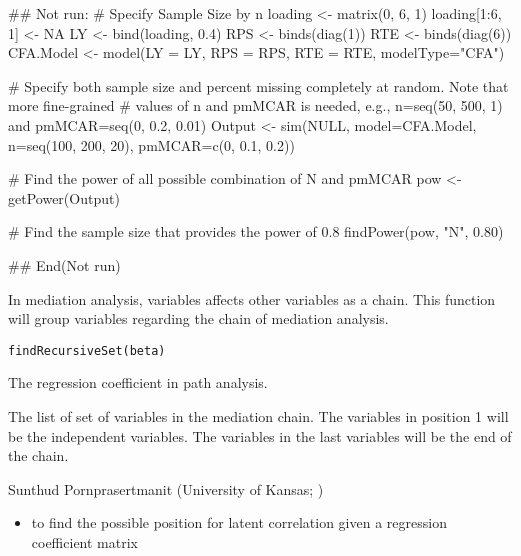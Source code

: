 \documentclass[a4paper]{book}
\begin{document}
%
\begin{Examples}
\begin{ExampleCode}
## Not run: 
# Specify Sample Size by n
loading <- matrix(0, 6, 1)
loading[1:6, 1] <- NA
LY <- bind(loading, 0.4)
RPS <- binds(diag(1))
RTE <- binds(diag(6))
CFA.Model <- model(LY = LY, RPS = RPS, RTE = RTE, modelType="CFA")

# Specify both sample size and percent missing completely at random. Note that more fine-grained 
# values of n and pmMCAR is needed, e.g., n=seq(50, 500, 1) and pmMCAR=seq(0, 0.2, 0.01)
Output <- sim(NULL, model=CFA.Model, n=seq(100, 200, 20), pmMCAR=c(0, 0.1, 0.2))

# Find the power of all possible combination of N and pmMCAR
pow <- getPower(Output)

# Find the sample size that provides the power of 0.8
findPower(pow, "N", 0.80)

## End(Not run)
\end{ExampleCode}
\end{Examples}
%
\begin{Description}\relax
In mediation analysis, variables affects other variables as a chain. This function will group variables regarding the chain of mediation analysis.
\end{Description}
%
\begin{Usage}
\begin{verbatim}
findRecursiveSet(beta)
\end{verbatim}
\end{Usage}
%
\begin{Arguments}
\begin{ldescription}
\item[\code{beta}] 
The regression coefficient in path analysis.

\end{ldescription}
\end{Arguments}
%
\begin{Value}
The list of set of variables in the mediation chain. The variables in position 1 will be the independent variables. The variables in the last variables will be the end of the chain.
\end{Value}
%
\begin{Author}\relax
Sunthud Pornprasertmanit (University of Kansas; )
\end{Author}
%
\begin{SeeAlso}\relax
\begin{itemize}

\item {} to find the possible position for latent correlation given a regression coefficient matrix

\end{itemize}

\end{SeeAlso}
\end{document}
